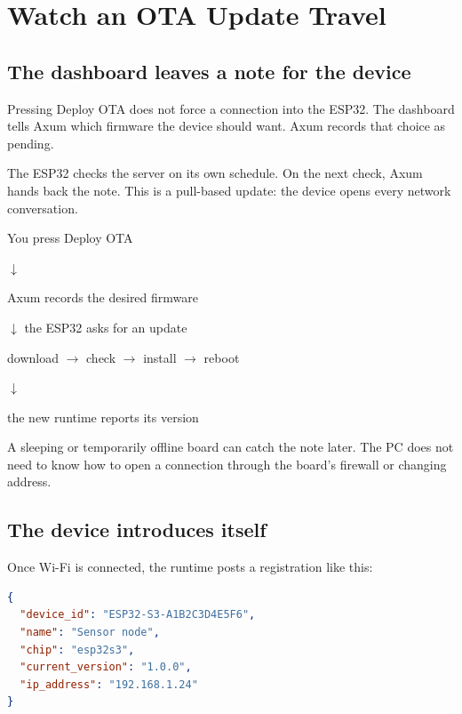 \chapter{Watch an OTA Update Travel}

\section{The dashboard leaves a note for the device}

Pressing Deploy OTA does not force a connection into the ESP32. The dashboard tells Axum which firmware the device should want. Axum records that choice as pending.

The ESP32 checks the server on its own schedule. On the next check, Axum hands back the note. This is a pull-based update: the device opens every network conversation.

\begin{center}
\begin{tcolorbox}[width=0.92\textwidth,colback=BookPaper,colframe=BookTealLight]
\centering\ttfamily
You press Deploy OTA\par
$\downarrow$\par
Axum records the desired firmware\par
$\downarrow$ the ESP32 asks for an update\par
download $\rightarrow$ check $\rightarrow$ install $\rightarrow$ reboot\par
$\downarrow$\par
the new runtime reports its version
\end{tcolorbox}
\end{center}

A sleeping or temporarily offline board can catch the note later. The PC does not need to know how to open a connection through the board's firewall or changing address.

\section{The device introduces itself}

Once Wi-Fi is connected, the runtime posts a registration like this:

\begin{lstlisting}[language=JSON,numbers=none]
{
  "device_id": "ESP32-S3-A1B2C3D4E5F6",
  "name": "Sensor node",
  "chip": "esp32s3",
  "current_version": "1.0.0",
  "ip_address": "192.168.1.24"
}
\end{lstlisting}

